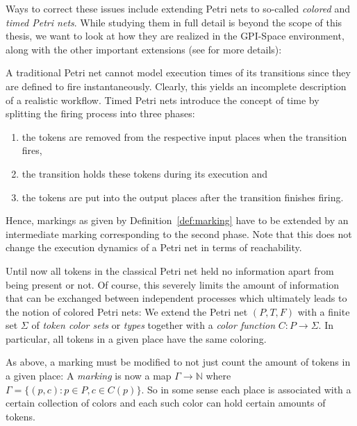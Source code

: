\documentclass[
  paper=a4,
  titlepage,
  bibliography=totoc,
  listof=totoc,
  pagesize=pdftex
]{scrartcl}
\numberwithin{figure}{section}
\numberwithin{equation}{section}
\numberwithin{table}{section}
\newcommand*\setN{\mathds{N}}
\theoremstyle{definition}
\numberwithin{definition}{section}
\begin{document}
Ways to correct these issues include extending Petri nets to so-called \emph{colored} and
\emph{timed Petri nets}. While studying them in full detail is beyond the scope of this
thesis, we want to look at how they are realized in the GPI-Space environment, along with
the other important extensions (see \cite[Section~3.2.2]{towardsParallel} for more
details): %
\begin{description}[leftmargin=\parindent]
  \item[Time:] A traditional Petri net cannot model execution times of its transitions
    since they are defined to fire instantaneously. Clearly, this yields an incomplete
    description of a realistic workflow. Timed Petri nets introduce the concept of time
    by splitting the firing process into three phases:
    \begin{enumerate}[label=\arabic*.]
      \item the tokens are removed from the respective input places when the transition
        fires,
      \item the transition holds these tokens during its execution and
      \item the tokens are put into the output places after the transition finishes
        firing.
    \end{enumerate}
    Hence, markings as given by Definition~\ref{def:marking} have to be extended by an
    intermediate marking corresponding to the second phase. Note that this does not change
    the execution dynamics of a Petri net in terms of reachability. %
  \item[Tokens and Data:] Until now all tokens in the classical Petri net held no
    information apart from being present or not. Of course, this severely limits the
    amount of information that can be exchanged between independent processes which
    ultimately leads to the notion of colored Petri nets: We extend the Petri net
    $(P,T,F)$ with a finite set $\Sigma$ of \emph{token color sets} or \emph{types}
    together with a \emph{color function} $C:P\to\Sigma$. In particular, all tokens in a
    given place have the same coloring.

    As above, a marking must be modified to not just count the amount of tokens in a given
    place: A \emph{marking} is now a map $\Gamma \to \setN$ where $\Gamma = \{ (p,c) : p
    \in P, c \in C(p) \}$. So in some sense each place is associated with a certain
    collection of colors and each such color can hold certain amounts of tokens.


\end{description}
\end{document}
